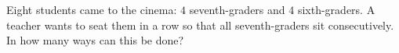 Eight students came to the cinema: $4$ seventh-graders and $4$ sixth-graders. A teacher wants to seat them in a row so that all seventh-graders sit consecutively. In how many ways can this be done?
